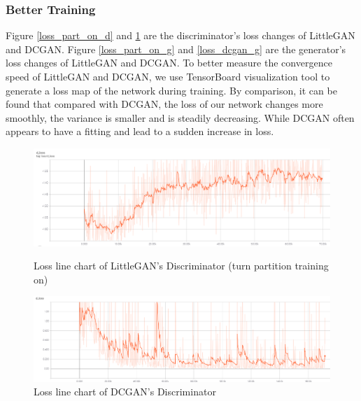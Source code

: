 \subsubsection*{Better Training}
Figure \ref{loss_part_on_d} and \ref{loss_dcgan_d} are the discriminator's loss changes of LittleGAN and DCGAN.
Figure \ref{loss_part_on_g} and \ref{loss_dcgan_g} are the generator's loss changes of LittleGAN and DCGAN.
To better measure the convergence speed of LittleGAN and DCGAN,
    we use TensorBoard visualization tool to generate a loss map of the network during training.
By comparison, it can be found that compared with DCGAN,
    the loss of our network changes more smoothly, the variance is smaller and is steadily decreasing.
While DCGAN often appears to have a fitting and lead to a sudden increase in loss.

    \begin{figure}
        \begin{minipage}[t]{0.49\linewidth}
            \centering
            \includegraphics[width=\textwidth]{figures/loss_part_on_d.png}
            \caption{Loss line chart of LittleGAN's Discriminator (turn partition training on)}
            \label{loss_part_on_d}
        \end{minipage}
            \hfill
        \begin{minipage}[t]{0.49\linewidth}
            \centering
            \includegraphics[width=\textwidth]{figures/loss_dcgan_d.png}
            \caption{Loss line chart of DCGAN's Discriminator}
            \label{loss_dcgan_d}
        \end{minipage}
    \end{figure}

